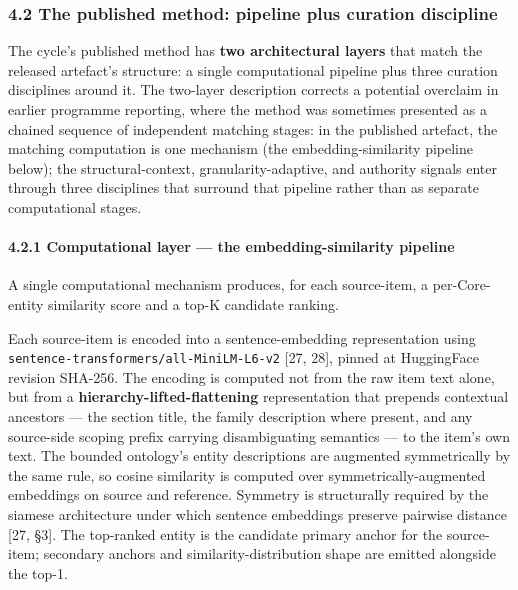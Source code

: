 \documentclass[
]{article}
\begin{document}
\subsubsection{4.2 The published method: pipeline plus curation
discipline}\label{the-published-method-pipeline-plus-curation-discipline}

The cycle's published method has \textbf{two architectural layers} that
match the released artefact's structure: a single computational pipeline
plus three curation disciplines around it. The two-layer description
corrects a potential overclaim in earlier programme reporting, where the
method was sometimes presented as a chained sequence of independent
matching stages: in the published artefact, the matching computation is
one mechanism (the embedding-similarity pipeline below); the
structural-context, granularity-adaptive, and authority signals enter
through three disciplines that surround that pipeline rather than as
separate computational stages.

\paragraph{4.2.1 Computational layer --- the embedding-similarity
pipeline}\label{computational-layer-the-embedding-similarity-pipeline}

A single computational mechanism produces, for each source-item, a
per-Core-entity similarity score and a top-K candidate ranking.

Each source-item is encoded into a sentence-embedding representation
using \texttt{sentence-transformers/all-MiniLM-L6-v2} {[}27, 28{]},
pinned at HuggingFace revision SHA-256. The encoding is computed not
from the raw item text alone, but from a
\textbf{hierarchy-lifted-flattening} representation that prepends
contextual ancestors --- the section title, the family description where
present, and any source-side scoping prefix carrying disambiguating
semantics --- to the item's own text. The bounded ontology's entity
descriptions are augmented symmetrically by the same rule, so cosine
similarity is computed over symmetrically-augmented embeddings on source
and reference. Symmetry is structurally required by the siamese
architecture under which sentence embeddings preserve pairwise distance
{[}27, §3{]}. The top-ranked entity is the candidate primary anchor for
the source-item; secondary anchors and similarity-distribution shape are
emitted alongside the top-1.
\end{document}
